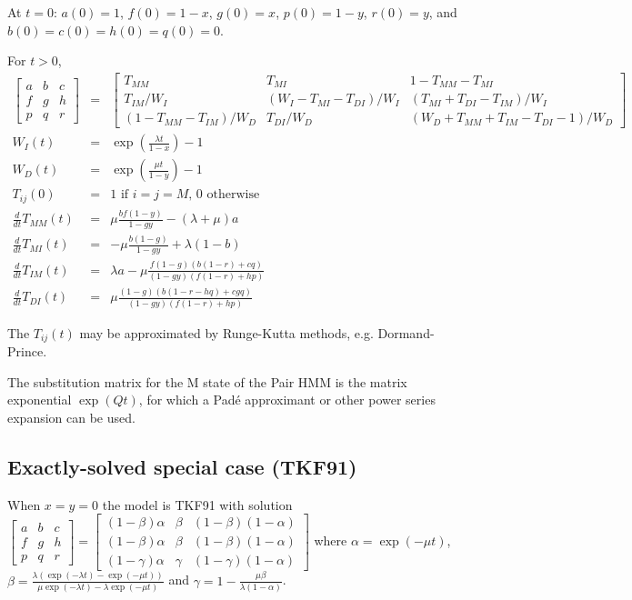 \documentclass{article}
\begin{document}
At $t=0$: $a(0)=1$, $f(0)=1-x$, $g(0)=x$, $p(0)=1-y$, $r(0)=y$, and $b(0)=c(0)=h(0)=q(0)=0$.

For $t>0$, %
\begin{eqnarray*}
\begin{bmatrix}
a & b & c \\
f & g & h \\
p & q & r 
\end{bmatrix}
& = &
\begin{bmatrix}
T_{MM} & T_{MI} & 1-T_{MM}-T_{MI} \\
T_{IM}/W_I & (W_I-T_{MI}-T_{DI})/W_I & (T_{MI}+T_{DI}-T_{IM})/W_I \\
(1-T_{MM}-T_{IM})/W_D & T_{DI}/W_D & (W_D+T_{MM}+T_{IM}-T_{DI}-1)/W_D 
\end{bmatrix}
\\
W_I(t) & = & \exp\left(\frac{\lambda t}{1-x}\right)-1 \\
W_D(t) & = & \exp\left(\frac{\mu t}{1-y}\right)-1 \\
T_{ij}(0) & = & \mbox{1 if $i=j=M$, 0 otherwise}
\\
  \frac{d}{dt} T_{MM}(t) & = &
  \mu \frac{b f (1-y)}{1 - g y}-(\lambda +\mu )a
  \nonumber \\
  \frac{d}{dt} T_{MI}(t) & = &
  -\mu \frac{b (1-g)}{1 - g y} + \lambda (1-b)
  \nonumber \\
  \frac{d}{dt} T_{IM}(t) & = &
  \lambda a - \mu \frac{f (1-g) (b (1-r)+c q)}{(1 - g y) (f (1-r)+h p)}
  \nonumber \\
  \frac{d}{dt} T_{DI}(t) & = &
  \mu \frac{(1-g) (b (1-r-h q)+c g q)}{(1-g y) (f (1-r)+h p)}
\end{eqnarray*}

The $T_{ij}(t)$ may be approximated by Runge-Kutta methods,
e.g. Dormand-Prince. %

The substitution matrix for the M state of the Pair HMM is
the matrix exponential $\exp(Qt)$, for which a Pad\'{e} approximant
or other power series expansion can be used. %

\subsection{Exactly-solved special case (TKF91)}

When $x=y=0$ the model is TKF91 \cite{ThorneEtAl91}
with solution
$
\begin{bmatrix}
a & b & c \\
f & g & h \\
p & q & r 
\end{bmatrix}
=
\begin{bmatrix}
(1-\beta)\alpha & \beta & (1-\beta)(1-\alpha) \\
(1-\beta)\alpha & \beta & (1-\beta)(1-\alpha) \\
(1-\gamma)\alpha & \gamma & (1-\gamma)(1-\alpha)
\end{bmatrix}
$
where
$\alpha = \exp(-\mu t)$,
$\beta = \frac{\lambda \left( \exp(-\lambda t) - \exp(-\mu t) \right)}{\mu \exp(-\lambda t) - \lambda \exp(-\mu t)}$
and
$\gamma = 1 - \frac{\mu \beta}{\lambda (1 - \alpha)}$.
\end{document}
